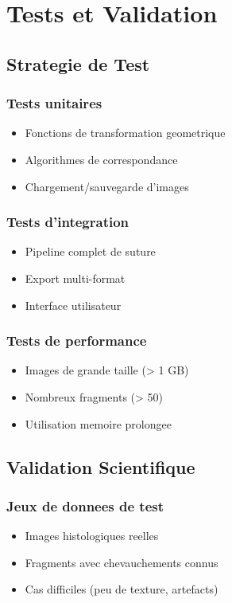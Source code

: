 \documentclass[12pt,a4paper]{article}
\begin{document}
\section{Tests et Validation}

\subsection{Strategie de Test}

\subsubsection{Tests unitaires}
\begin{itemize}
\item Fonctions de transformation geometrique
\item Algorithmes de correspondance
\item Chargement/sauvegarde d'images
\end{itemize}

\subsubsection{Tests d'integration}
\begin{itemize}
\item Pipeline complet de suture
\item Export multi-format
\item Interface utilisateur
\end{itemize}

\subsubsection{Tests de performance}
\begin{itemize}
\item Images de grande taille (> 1 GB)
\item Nombreux fragments (> 50)
\item Utilisation memoire prolongee
\end{itemize}

\subsection{Validation Scientifique}

\subsubsection{Jeux de donnees de test}
\begin{itemize}
\item Images histologiques reelles
\item Fragments avec chevauchements connus
\item Cas difficiles (peu de texture, artefacts)
\end{itemize}
\end{document}

